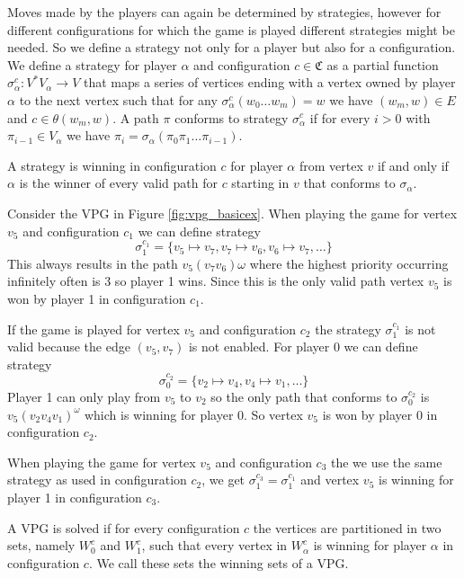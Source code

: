 Moves made by the players can again be determined by strategies, however for different configurations for which the game is played different strategies might be needed. So we define a strategy not only for a player but also for a configuration. We define a strategy for player $\alpha$ and configuration $c \in \mathfrak{C}$ as a partial function $\sigma_\alpha^c : V^*V_\alpha \rightarrow V$ that maps a series of vertices ending with a vertex owned by player $\alpha$ to the next vertex such that for any $\sigma_\alpha^c(w_0\dots w_m) = w$ we have $(w_m,w) \in E$ and $c \in \theta(w_m,w)$. A path $\pi$ conforms to strategy $\sigma_\alpha^c$ if for every $i > 0$ with $\pi_{i-1}\in V_\alpha$ we have $\pi_i = \sigma_\alpha(\pi_0\pi_1\dots\pi_{i-1})$.

A strategy is winning in configuration $c$ for player $\alpha$ from vertex $v$ if and only if $\alpha$ is the winner of every valid path for $c$ starting in $v$ that conforms to $\sigma_\alpha$.

\begin{example}
	Consider the VPG in Figure \ref{fig:vpg_basicex}. When playing the game for vertex $v_5$ and configuration $c_1$ we can define strategy 
	\[ \sigma_1^{c_1} = \{ v_5 \mapsto v_7, v_7\mapsto v_6,v_6\mapsto v_7, \dots \}\]
	This always results in the path $v_5(v_7v_6)\omega$ where the highest priority occurring infinitely often is 3 so player 1 wins. Since this is the only valid path vertex $v_5$ is won by player 1 in configuration $c_1$.
	
	If the game is played for vertex $v_5$ and configuration $c_2$ the strategy $\sigma_1^{c_1}$ is not valid because the edge $(v_5,v_7)$ is not enabled. For player $0$ we can define strategy
	\[ \sigma_0^{c_2} = \{ v_2 \mapsto v_4, v_4 \mapsto v_1,\dots\}\]
	Player 1 can only play from $v_5$ to $v_2$ so the only path that conforms to $\sigma_0^{c_2}$ is $v_5(v_2v_4v_1)^\omega$ which is winning for player 0. So vertex $v_5$ is won by player 0 in configuration $c_2$.
	
	When playing the game for vertex $v_5$ and configuration $c_3$ the we use the same strategy as used in configuration $c_2$, we get $\sigma_1^{c_3} = \sigma_1^{c_1}$ and vertex $v_5$ is winning for player 1 in configuration $c_3$.
\end{example}

A VPG is solved if for every configuration $c$ the vertices are partitioned in two sets, namely $W_0^c$ and $W_1^c$, such that every vertex in $W_\alpha^c$ is winning for player $\alpha$ in configuration $c$. We call these sets the winning sets of a VPG.

